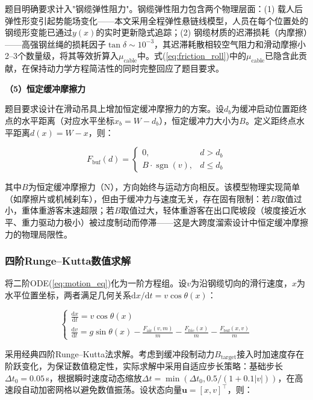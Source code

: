 \documentclass[12pt,a4paper]{ctexart}
\begin{document}
题目明确要求计入"钢缆弹性阻力"。钢缆弹性阻力包含两个物理层面：(1) 载人后弹性形变引起势能场变化——本文采用全程弹性悬链线模型，人员在每个位置处的钢缆形变能已通过$y(x)$的实时更新隐式追踪；(2) 钢缆材质的迟滞损耗（内摩擦）——高强钢丝绳的损耗因子$\tan\delta\sim 10^{-3}$，其迟滞耗散相较空气阻力和滑动摩擦小2--3个数量级，将其等效折算入$\mu_{\text{cable}}$中。式(\ref{eq:friction_roll})中的$\mu_{\text{cable}}$已隐含此贡献，在保持动力学方程简洁性的同时完整回应了题目要求。

\textbf{（5）恒定缓冲摩擦力}

题目要求设计在滑动吊具上增加恒定缓冲摩擦力的方案。设$d_b$为缓冲启动位置距终点的水平距离（对应水平坐标$x_b = W-d_b$），恒定缓冲力大小为$B$。定义距终点水平距离$d(x)=W-x$，则：

\begin{equation}
  F_{\text{buf}}(d) =
  \begin{cases}
    0, & d > d_b \\
    B \cdot \operatorname{sgn}(v), & d \leq d_b
  \end{cases}
  \label{eq:buffer_force}
\end{equation}

其中$B$为恒定缓冲摩擦力（N），方向始终与运动方向相反。该模型物理实现简单（如摩擦片或机械刹车），但由于缓冲力与速度无关，存在固有限制：若$B$取值过小，重体重游客末速超限；若$B$取值过大，轻体重游客在出口爬坡段（坡度接近水平、重力驱动力极小）被过度制动而停滞——这是大跨度溜索设计中恒定缓冲摩擦力的物理局限性。

\subsubsection{四阶Runge--Kutta数值求解}

将二阶ODE(\ref{eq:motion_eq})化为一阶方程组。设$v$为沿钢缆切向的滑行速度，$x$为水平位置坐标，两者满足几何关系$\mathrm{d}x/\mathrm{d}t = v\cos\theta(x)$：

\begin{equation}
  \begin{cases}
    \displaystyle\frac{\mathrm{d}x}{\mathrm{d}t} = v\cos\theta(x) \\[8pt]
    \displaystyle\frac{\mathrm{d}v}{\mathrm{d}t} = g\sin\theta(x) - \frac{F_{\text{air}}(v,m)}{m} - \frac{F_{\text{fric}}(x)}{m} - \frac{F_{\text{buf}}(x,v)}{m}
  \end{cases}
  \label{eq:ode_system}
\end{equation}

采用经典四阶Runge--Kutta法求解。考虑到缓冲段制动力$B_{\text{target}}$接入时加速度存在阶跃变化，为保证数值稳定性，实际求解中采用自适应步长策略：基础步长$\Delta t_0 = 0.05$\,s，根据瞬时速度动态缩放$\Delta t = \min(\Delta t_0, 0.5/(1+0.1|v|))$，在高速段自动加密网格以避免数值振荡。设状态向量$\mathbf{u} = [x, v]^\top$，则：
\end{document}
